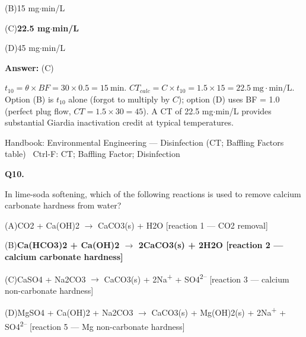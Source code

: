 \documentclass[11pt]{article}
\newcommand{\correct}[1]{\textbf{#1}\;{\color{accent}$\checkmark$}}
\newcommand{\optline}[2]{\par\noindent\hspace{1.2em}(#1)\hspace{0.6em}#2}
\begin{document}
\optline{B}{15 mg$\cdot$min/L}
\optline{C}{\correct{22.5 mg$\cdot$min/L}}
\optline{D}{45 mg$\cdot$min/L}
\par\vspace{3pt}
\vspace{2pt}\par\noindent\colorbox{boxbg}{\parbox{\dimexpr\linewidth-2\fboxsep\relax}{%
\vspace{2pt}\textbf{Answer:} (C)\par\vspace{2pt}
{\small $t_{10} = \theta\times BF = 30\times 0.5 = 15\ \mathrm{min}$.  $CT_{calc} = C\times t_{10} = 1.5\times15 = 22.5\ \mathrm{mg\cdot min/L}$. Option (B) is $t_{10}$ alone (forgot to multiply by $C$); option (D) uses BF = 1.0 (perfect plug flow, $CT = 1.5\times30 = 45$). A CT of 22.5 mg$\cdot$min/L provides substantial Giardia inactivation credit at typical temperatures.}\par\vspace{2pt}
{\footnotesize\color{soft}Handbook: Environmental Engineering --- Disinfection (CT; Baffling Factors table) \textbullet\ Ctrl-F: CT; Baffling Factor; Disinfection}\vspace{2pt}
}}
\vspace{9pt}
\filbreak
\textbf{\color{accent}Q10.}\par\vspace{2pt}
In lime-soda softening, which of the following reactions is used to remove calcium carbonate hardness from water?\par\vspace{3pt}
\optline{A}{CO2 + Ca(OH)2 $\rightarrow$ CaCO3(s) + H2O  [reaction 1 --- CO2 removal]}
\optline{B}{\correct{Ca(HCO3)2 + Ca(OH)2 $\rightarrow$ 2CaCO3(s) + 2H2O  [reaction 2 --- calcium carbonate hardness]}}
\optline{C}{CaSO4 + Na2CO3 $\rightarrow$ CaCO3(s) + 2Na\textsuperscript{+} + SO4\textsuperscript{2}\textsuperscript{--}  [reaction 3 --- calcium non-carbonate hardness]}
\optline{D}{MgSO4 + Ca(OH)2 + Na2CO3 $\rightarrow$ CaCO3(s) + Mg(OH)2(s) + 2Na\textsuperscript{+} + SO4\textsuperscript{2}\textsuperscript{--}  [reaction 5 --- Mg non-carbonate hardness]}
\par\vspace{3pt}
\end{document}
